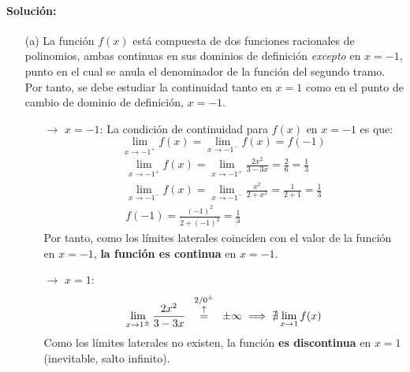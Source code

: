 \paragraph{Solución:}
\begin{enumerate}
    \item[(a)] La función $f(x)$ está compuesta de dos funciones racionales de polinomios, ambas continuas en sus dominios de definición \emph{excepto} en $x=-1$, punto en el cual se anula el denominador de la función del segundo tramo. Por tanto, se debe estudiar la continuidad tanto en $x=1$ como en el punto de cambio de dominio de definición, $x=-1$.
    \begin{enumerate}
        \item[$\rightarrow $]$x=-1$: La condición de continuidad para $f(x)$ en $x=-1$ es que:
        $$
        \lim_{x\to -1^+} f(x)=\lim_{x\to -1^-} f(x)=f(-1)
        $$
        \begin{gather*}
            \lim_{x\to -1^+} f(x)=\lim_{x\to -1^+} \frac{2x^2}{3-3x}=\frac{2}{6}=\frac{1}{3}\\
            \lim_{x\to -1^-} f(x)=\lim_{x\to -1^-} \frac{x^2}{2+x^2}=\frac{1}{2+1}=\frac{1}{3}\\
            f(-1)=\frac{(-1)^2}{2+(-1)^2}=\frac{1}{3}
        \end{gather*}
        Por tanto, como los límites laterales coinciden con el valor de la función en $x=-1$, \textbf{la función es continua} en $x=-1$.

        \item[$\rightarrow $]$x=1$: 
        $$
        \lim_{x\to 1^\pm } \frac{2x^2}{3-3x} \overset{\scriptsize \begin{array}{c}
             2/0^\pm   \\
              \uparrow
        \end{array}}{=}\pm \infty  \implies \nexists \lim_{x\to 1} f(x)
        $$
        Como los límites laterales no existen, la función \textbf{es discontinua }en $x=1$ (inevitable, salto infinito).
    \end{enumerate}


\end{enumerate}
